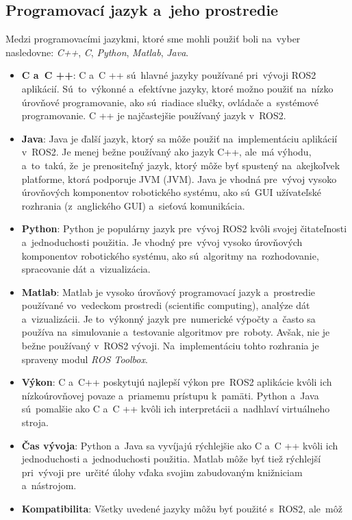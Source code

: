 \subsection{Programovací jazyk a~jeho prostredie}
\label{sec:programovaci_jazyk}

Medzi programovacími jazykmi, ktoré sme mohli použiť boli na~vyber nasledovne: \textit{C++}, \textit{C}, \textit{Python},
\textit{Matlab}, \textit{Java}.

\begin{itemize}
	\item \textbf{C a~C ++}: C a~C ++ sú~hlavné jazyky používané pri~vývoji ROS2 aplikácií. Sú~to~výkonné a~efektívne jazyky,
		ktoré možno použiť na~nízko úrovňové programovanie, ako sú~riadiace slučky, ovládače a~systémové programovanie.
		C ++ je najčastejšie používaný jazyk v~ROS2.

	\item \textbf{Java}: Java je ďalší jazyk, ktorý sa môže použiť na~implementáciu aplikácií v~ROS2. Je menej bežne
		používaný ako jazyk C++, ale~má výhodu, a~to~takú, že~je prenositeľný jazyk, ktorý môže byť spustený na~akejkoľvek
		platforme, ktorá podporuje JVM (\acrlong{JVM}). Java je vhodná pre~vývoj vysoko úrovňových komponentov robotického
		systému, ako sú~GUI užívateľské rozhrania (z~anglického \acrlong{GUI}) a~sieťová komunikácia.

	\item \textbf{Python}: Python je populárny jazyk pre~vývoj ROS2 kvôli svojej čitateľnosti a~jednoduchosti použitia.
		Je vhodný pre~vývoj vysoko úrovňových komponentov robotického systému, ako sú~algoritmy na~rozhodovanie,
		spracovanie dát a~vizualizácia.

	\item \textbf{Matlab}: Matlab je vysoko úrovňový programovací jazyk a~prostredie používané vo~vedeckom prostredi
		(scientific computing), analýze dát a~vizualizácii. Je to~výkonný jazyk pre~numerické výpočty a~často sa používa
		na~simulovanie a~testovanie algoritmov pre~roboty. Avšak, nie je bežne používaný v~ROS2 vývoji. Na~implementáciu
		tohto rozhrania je spraveny modul \textit{ROS Toolbox}.

	\item \textbf{Výkon}: C a~C++ poskytujú najlepší výkon pre~ROS2 aplikácie kvôli ich nízkoúrovňovej povaze a~priamemu
		prístupu k~pamäti. Python a~Java sú~pomalšie ako C a~C ++ kvôli ich interpretácii a~nadhlaví virtuálneho stroja.

	\item \textbf{Čas vývoja}: Python a~Java sa vyvíjajú rýchlejšie ako C a~C ++ kvôli ich jednoduchosti a~jednoduchosti
		použitia. Matlab môže byť tiež rýchlejší pri~vývoji pre~určité úlohy vďaka svojim zabudovaným knižniciam a~nástrojom.

	\item \textbf{Kompatibilita}: Všetky uvedené jazyky môžu byť použité s~ROS2, ale~môž
\end{itemize}

